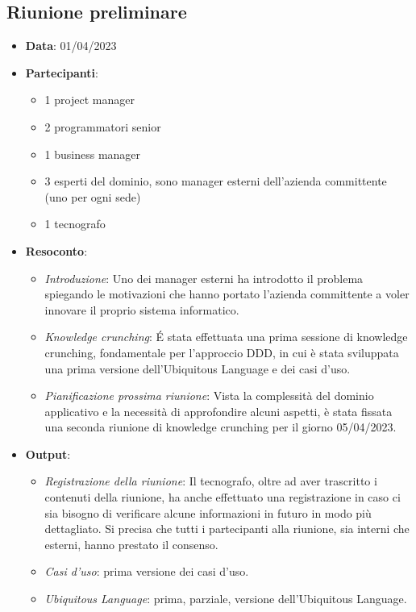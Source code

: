 \documentclass{article}
\begin{document}
  \subsection{Riunione preliminare}
  \begin{itemize}
    \item \textbf{Data}: 01/04/2023
    \item \textbf{Partecipanti}:
    \begin{itemize}
      \item 1 project manager
      \item 2 programmatori senior
      \item 1 business manager
      \item 3 esperti del dominio, sono manager esterni dell'azienda committente (uno per ogni sede)
      \item 1 tecnografo
    \end{itemize}
    \item \textbf{Resoconto}:
    \begin{itemize}
      \item \emph{Introduzione}: 
        Uno dei manager esterni ha introdotto il problema spiegando le motivazioni che hanno portato l'azienda 
          committente a voler innovare il proprio sistema informatico.
      \item \emph{Knowledge crunching}:
        É stata effettuata una prima sessione di knowledge crunching, fondamentale per l'approccio DDD, in cui è stata
          sviluppata una prima versione dell'Ubiquitous Language e dei casi d'uso.
      \item \emph{Pianificazione prossima riunione}:
        Vista la complessità del dominio applicativo e la necessità di approfondire alcuni aspetti, è stata fissata
          una seconda riunione di knowledge crunching per il giorno 05/04/2023.
    \end{itemize}
    \item \textbf{Output}:
    \begin{itemize}
      \item \emph{Registrazione della riunione}: 
        Il tecnografo, oltre ad aver trascritto i contenuti della riunione, ha anche effettuato una registrazione in caso
          ci sia bisogno di verificare alcune informazioni in futuro in modo più dettagliato. Si precisa che tutti i 
          partecipanti alla riunione, sia interni che esterni, hanno prestato il consenso.
      \item \emph{Casi d'uso}: prima versione dei casi d'uso.
      \item \emph{Ubiquitous Language}: prima, parziale, versione dell'Ubiquitous Language.
    \end{itemize}
  \end{itemize}
\end{document}
